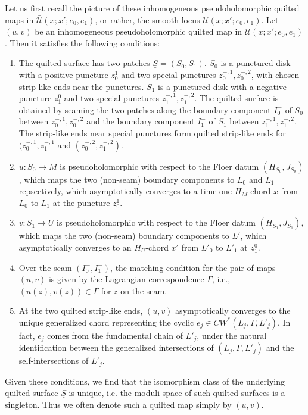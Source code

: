 \documentclass{amsart}
\numberwithin{equation}{section}
\numberwithin{figure}{section}
\begin{document}
	Let us first recall the picture of these inhomogeneous pseudoholomorphic quilted maps in $\bar{\mathcal{U}}(x; x'; e_{0}, e_{1})$, or rather, the smooth locus $\mathcal{U}(x; x'; e_{0}, e_{1})$. Let $(u, v)$ be an inhomogeneous pseudoholomorphic quilted map in $\mathcal{U}(x; x'; e_{0}, e_{1})$. Then it satisfies the following conditions:
\begin{enumerate}[label=(\roman*)]

\item The quilted surface has two patches $\underline{S} = (S_{0}, S_{1})$. $S_{0}$ is a punctured disk with a positive puncture $z_{0}^{1}$ and two special punctures $z_{0}^{-, 1}, z_{0}^{-, 2}$, with chosen strip-like ends near the punctures. $S_{1}$ is a punctured disk with a negative puncture $z_{1}^{0}$ and two special punctures $z_{1}^{-, 1}, z_{1}^{-, 2}$. The quilted surface is obtained by seaming the two patches along the boundary component $I_{0}^{-}$ of $S_{0}$ between $z_{0}^{-, 1}, z_{0}^{-, 2}$ and the boundary component $I_{1}^{-}$ of $S_{1}$ between $z_{1}^{-, 1}, z_{1}^{-, 2}$. The strip-like ends near special punctures form quilted strip-like ends for $(z_{0}^{-, 1}, z_{1}^{-, 1}$ and $(z_{0}^{-, 2}, z_{1}^{-, 2})$.

\item $u: S_{0} \to M$ is pseudoholomorphic with respect to the Floer datum $(H_{S_{0}}, J_{S_{0}})$, which maps the two (non-seam) boundary components to $L_{0}$ and $L_{1}$ repsectively, which asymptotically converges to a time-one $H_{M}$-chord $x$ from $L_{0}$ to $L_{1}$ at the puncture $z_{0}^{1}$.

\item $v: S_{1} \to U$ is pseudoholomorphic with respect to the Floer datum $(H_{S_{1}}, J_{S_{1}})$, which maps the two (non-seam) boundary components to $L'$, which asymptotically converges to an $H_{U}$-chord $x'$ from $L'_{0}$ to $L'_{1}$ at $z_{1}^{0}$.

\item Over the seam $(I_{0}^{-}, I_{1}^{-})$, the matching condition for the pair of maps $(u, v)$ is given by the Lagrangian correspondence $\Gamma$, i.e., $(u(z), v(z)) \in \Gamma$ for $z$ on the seam.

\item At the two quilted strip-like ends, $(u, v)$ asymptotically converges to the unique generalized chord representing the cyclic $e_{j} \in CW^{*}(L_{j}, \Gamma, L'_{j})$. In fact, $e_{j}$ comes from the fundamental chain of $L'_{j}$, under the natural identification between the generalized intersections of $(L_{j}, \Gamma, L'_{j})$ and the self-intersections of $L'_{j}$.

\end{enumerate}
Given these conditions, we find that the isomorphism class of the underlying quilted surface $\underline{S}$ is unique, i.e. the moduli space of such quilted surfaces is a singleton. Thus we often denote such a quilted map simply by $(u, v)$. \par
\end{document}
